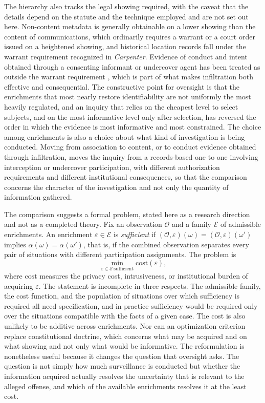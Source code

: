\documentclass[11pt]{article}
\theoremstyle{definition}
\theoremstyle{remark}
\begin{document}
The hierarchy also tracks the legal showing required, with the caveat that the details depend on the statute and the technique employed and are not set out here. Non-content metadata is generally obtainable on a lower showing than the content of communications, which ordinarily requires a warrant or a court order issued on a heightened showing, and historical location records fall under the warrant requirement recognized in \emph{Carpenter}. Evidence of conduct and intent obtained through a consenting informant or undercover agent has been treated as outside the warrant requirement \cite{hoffa1966,white1971}, which is part of what makes infiltration both effective and consequential. The constructive point for oversight is that the enrichments that most nearly restore identifiability are not uniformly the most heavily regulated, and an inquiry that relies on the cheapest level to select subjects, and on the most informative level only after selection, has reversed the order in which the evidence is most informative and most constrained. The choice among enrichments is also a choice about what kind of investigation is being conducted. Moving from association to content, or to conduct evidence obtained through infiltration, moves the inquiry from a records-based one to one involving interception or undercover participation, with different authorization requirements and different institutional consequences, so that the comparison concerns the character of the investigation and not only the quantity of information gathered.

The comparison suggests a formal problem, stated here as a research direction and not as a completed theory. Fix an observation $\mathcal{O}$ and a family $\mathcal{E}$ of admissible enrichments. An enrichment $\varepsilon \in \mathcal{E}$ is \emph{sufficient} if $(\mathcal{O},\varepsilon)(\omega) = (\mathcal{O},\varepsilon)(\omega')$ implies $\alpha(\omega) = \alpha(\omega')$, that is, if the combined observation separates every pair of situations with different participation assignments. The problem is
\[
\min_{\varepsilon \in \mathcal{E}\ \text{sufficient}} \mathrm{cost}(\varepsilon),
\]
where $\mathrm{cost}$ measures the privacy cost, intrusiveness, or institutional burden of acquiring $\varepsilon$. The statement is incomplete in three respects. The admissible family, the cost function, and the population of situations over which sufficiency is required all need specification, and in practice sufficiency would be required only over the situations compatible with the facts of a given case. The cost is also unlikely to be additive across enrichments. Nor can an optimization criterion replace constitutional doctrine, which concerns what may be acquired and on what showing and not only what would be informative. The reformulation is nonetheless useful because it changes the question that oversight asks. The question is not simply how much surveillance is conducted but whether the information acquired actually resolves the uncertainty that is relevant to the alleged offense, and which of the available enrichments resolves it at the least cost.
\end{document}
